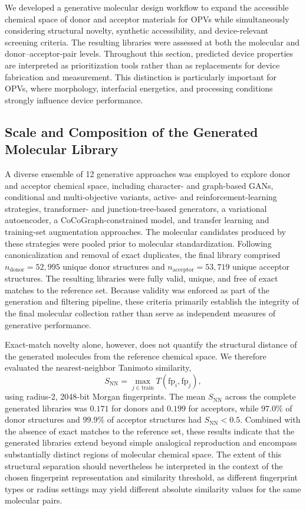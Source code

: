\documentclass[12pt]{article}
\begin{document}
We developed a generative molecular design workflow to expand the accessible chemical space of donor and acceptor materials for OPVs while simultaneously considering structural novelty, synthetic accessibility, and device-relevant screening criteria. The resulting libraries were assessed at both the molecular and donor--acceptor-pair levels. Throughout this section, predicted device properties are interpreted as prioritization tools rather than as replacements for device fabrication and measurement. This distinction is particularly important for OPVs, where morphology, interfacial energetics, and processing conditions strongly influence device performance.

\subsection{Scale and Composition of the Generated Molecular Library}
A diverse ensemble of 12 generative approaches was employed to explore donor and acceptor chemical space, including character- and graph-based GANs, conditional and multi-objective variants, active- and reinforcement-learning strategies, transformer- and junction-tree-based generators, a variational autoencoder, a CoCoGraph-constrained model, and transfer learning and training-set augmentation approaches. The molecular candidates produced by these strategies were pooled prior to molecular standardization. Following canonicalization and removal of 
exact duplicates, the final library comprised $n_{\mathrm{donor}} = 52{,}995$ unique donor structures and $n_{\mathrm{acceptor}} = 53{,}719$ unique acceptor structures. The resulting libraries were fully valid, unique, and free of exact matches to the reference set. Because validity was enforced as part of the generation and filtering pipeline, these criteria primarily establish the integrity of the final molecular collection rather than serve as independent measures of generative performance.

Exact-match novelty alone, however, does not quantify the structural distance of the generated molecules from the reference chemical space. We therefore evaluated the nearest-neighbor Tanimoto similarity,
\begin{equation}
S_{\mathrm{NN}} = \max_{j \in \mathrm{train}} T(\mathrm{fp}_i,\mathrm{fp}_j),
\end{equation}
using radius-2, 2048-bit Morgan fingerprints. The mean $S_{\mathrm{NN}}$ across the complete generated libraries was $0.171$ for donors and $0.199$ for acceptors, while $97.0\%$ of donor structures and $99.9\%$ of acceptor structures had $S_{\mathrm{NN}} < 0.5$. Combined with the absence of exact matches to the reference set, these results indicate that the generated libraries extend beyond simple analogical reproduction and encompass substantially distinct regions of molecular chemical space. The extent of this structural separation should nevertheless be interpreted in the context of the chosen fingerprint representation and similarity threshold, as different fingerprint types or radius settings may yield different absolute similarity values for the same molecular pairs.
\end{document}
